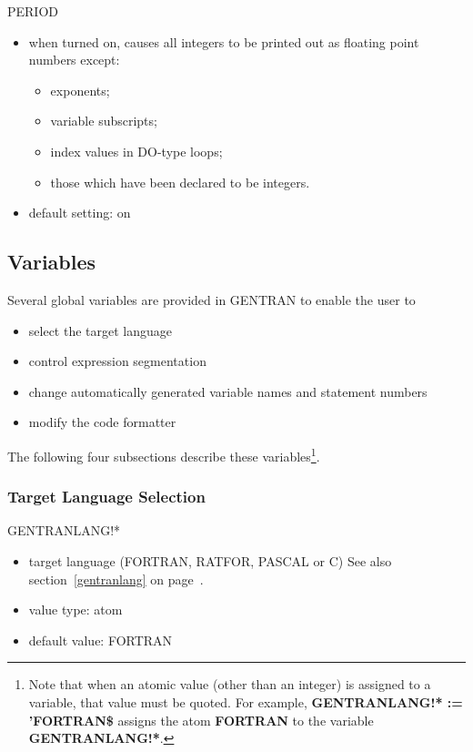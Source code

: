 \begin{describe}{PERIOD}
\begin{itemize}
\item when turned on, causes all integers to be printed out as floating point
numbers except:
\begin{itemize}
\item exponents;
\item variable subscripts;
\item index values in DO-type loops;
\item those which have been declared to be integers.
\end{itemize}
\item default setting:  on
\end{itemize}
\end{describe}


\subsection{Variables}
Several global variables are provided in GENTRAN to enable the
user to
\begin{itemize}
\item select the target language
\item control expression segmentation
\item change automatically generated variable names and statement numbers
\item modify the code formatter
\end{itemize}

The following four subsections describe these variables\footnote{
Note that when an atomic value (other than an integer) is assigned to a
variable, that value must be quoted.  For example,
{\bf GENTRANLANG!* := 'FORTRAN\$}
assigns the atom {\bf FORTRAN} to the variable {\bf GENTRANLANG!*}.}.

\subsubsection{Target Language Selection}
\begin{describe}{GENTRANLANG!*}
\begin{itemize}
\item target language (FORTRAN, RATFOR, PASCAL or C)
See also section~\ref{gentranlang} on page~\pageref{gentranlang}.
\item value type:  atom
\item default value:  FORTRAN
\end{itemize}
\end{describe}

